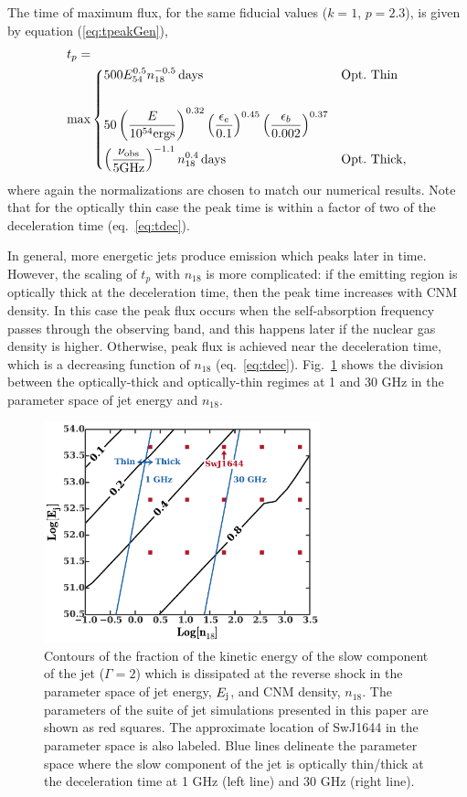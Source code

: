 \documentclass[usenatbib,fleqn]{mnras}
\begin{document}
The time of maximum flux, for the same fiducial values ($k = 1$,
$p=2.3$), is given by equation (\ref{eq:tpeakGen}),
\begin{align}
&t_p =\nonumber\\ &\text{max}
\begin{dcases}
  500 E_{54}^{0.5} n_{18}^{-0.5} \,{\rm days} & {\rm Opt.~Thin}\\\\
  50 \left(\frac{E}{10^{54} {\rm ergs}}\right)^{0.32}
  \left(\frac{\epsilon_e}{0.1}\right)^{0.45}
  \left(\frac{\epsilon_b}{0.002}\right)^{0.37}\\
  \left(\frac{\nu_{\rm obs}}{5 {\rm GHz}}\right)^{-1.1} n_{18}^{0.4}
  \,{\rm days}& {\rm Opt.~Thick},
\end{dcases}
\label{eq:peakTime}
\end{align}
where again the normalizations are chosen to match our numerical
results. Note that for the optically thin case the peak time
is within a factor of two of the deceleration time
(eq.~\ref{eq:tdec}).

In general, more energetic jets produce emission which peaks later in
time.  However, the scaling of $t_p$ with $n_{18}$ is more
complicated: if the emitting region is optically thick at the
deceleration time, then the peak time increases with CNM density. In
this case the peak flux occurs when the self-absorption frequency
passes through the observing band, and this happens later if the
nuclear gas density is higher. Otherwise, peak flux is achieved near
the deceleration time, which is a decreasing function of $n_{18}$
(eq.~\ref{eq:tdec}).  Fig.~\ref{fig:diss} shows the division between
the optically-thick and optically-thin regimes at 1 and 30 GHz in the
parameter space of jet energy and $n_{18}$.

\begin{figure}
\includegraphics[width=8cm]{diss.pdf}
\caption{\label{fig:diss} Contours of the fraction of the kinetic
  energy of the slow component of the jet ($\Gamma=2$) which is
  dissipated at the reverse shock in the parameter space of jet
  energy, $E_{\rm j}$, and CNM density, $n_{18}$.  The parameters of
  the suite of jet simulations presented in this paper are shown as
  red squares. The approximate location of SwJ1644 in the parameter
  space is also labeled.  Blue lines delineate the parameter space
  where the slow component of the jet is optically thin/thick at the
  deceleration time at 1 GHz (left line) and 30 GHz (right line).}
\end{figure}
\end{document}
